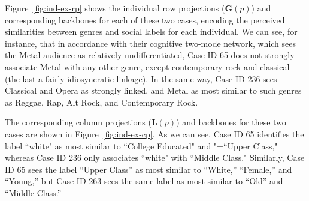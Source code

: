 \documentclass[12pt]{article}
\begin{document}
Figure~\ref{fig:ind-ex-rp} shows the individual row projections ($\mathbf{G}(p)$) and corresponding backbones for each of these two cases, encoding the perceived similarities between genres and social labels for each individual. We can see, for instance, that in accordance with their cognitive two-mode network, which sees the Metal audience as relatively undifferentiated, Case ID 65 does not strongly associate Metal with any other genre, except contemporary rock and classical (the last a fairly idiosyncratic linkage). In the same way, Case ID 236 sees Classical and Opera as strongly linked, and Metal as most similar to such genres as Reggae, Rap, Alt Rock, and Contemporary Rock. 

The corresponding column projections ($\mathbf{L}(p)$) and backbones for these two cases are shown in Figure~\ref{fig:ind-ex-cp}. As we can see, Case ID 65 identifies the label ``white" as most similar to ``College Educated" and "=``Upper Class," whereas Case ID 236 only associates ``white" with ``Middle Class." Similarly, Case ID 65 sees the label ``Upper Class'' as most similar to ``White,'' ``Female,'' and ``Young,'' but Case ID 263 sees the same label as most similar to ``Old'' and ``Middle Class.''
\end{document}
